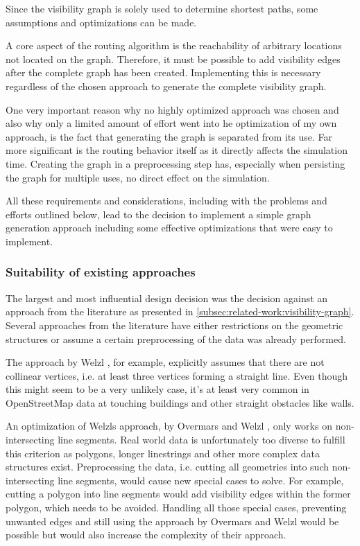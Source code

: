 			Since the visibility graph is solely used to determine shortest paths, some assumptions and optimizations can be made.
			
			A core aspect of the routing algorithm is the reachability of arbitrary locations not located on the graph.
			Therefore, it must be possible to add visibility edges after the complete graph has been created.
			Implementing this is necessary regardless of the chosen approach to generate the complete visibility graph.
			
			One very important reason why no highly optimized approach was chosen and also why only a limited amount of effort went into he optimization of my own approach, is the fact that generating the graph is separated from its use.
			Far more significant is the routing behavior itself as it directly affects the simulation time.
			Creating the graph in a preprocessing step has, especially when persisting the graph for multiple uses, no direct effect on the simulation.
			
			All these requirements and considerations, including with the problems and efforts outlined below, lead to the decision to implement a simple graph generation approach including some effective optimizations that were easy to implement.
		
		\subsubsection{Suitability of existing approaches}
	
			The largest and most influential design decision was the decision against an approach from the literature as presented in \cref{subsec:related-work:visibility-graph}.
			Several approaches from the literature have either restrictions on the geometric structures or assume a certain preprocessing of the data was already performed.
			
			The approach by Welzl \cite{welzl-visibility-graph}, for example, explicitly assumes that there are not collinear vertices, i.e. at least three vertices forming a straight line.
			Even though this might seem to be a very unlikely case, it's at least very common in OpenStreetMap data at touching buildings and other straight obstacles like walls.
			
			An optimization of Welzls approach, by Overmars and Welzl \cite{overmars-weizl-visibility-graph}, only works on non-intersecting line segments.
			Real world data is unfortunately too diverse to fulfill this criterion as polygons, longer linestrings and other more complex data structures exist.
			Preprocessing the data, i.e. cutting all geometries into such non-intersecting line segments, would cause new special cases to solve.
			For example, cutting a polygon into line segments would add visibility edges within the former polygon, which needs to be avoided.
			Handling all those special cases, preventing unwanted edges and still using the approach by Overmars and Welzl would be possible but would also increase the complexity of their approach.
			
